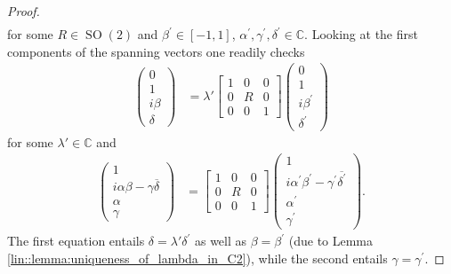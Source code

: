 \documentclass[10pt,a4paper]{amsart}
\newcommand{\C}{\mathbb{C}}
\DeclareMathOperator{\SO}{SO}
\begin{document}
\begin{proof}
\begin{align*}
    \end{align*}
    for some $R \in \SO(2)$ and $\beta^\prime \in [-1,1]$, $\alpha^\prime, \gamma^\prime, \delta^\prime \in \C$. Looking at the first components of the spanning vectors one readily checks
    \begin{align}
        \begin{pmatrix}
            0 \\ 1 \\ i \beta \\ \delta
        \end{pmatrix}
        &=
        \lambda' \left[\begin{array}{c|c|c}
            1& 0 & 0 \\
            \hline
            0 & R & 0 \\
            \hline 
            0 & 0 & 1
        \end{array}\right]
        \begin{pmatrix}
            0 \\ 1 \\ i \beta^\prime \\ \delta^\prime
        \end{pmatrix} 
    \end{align}
    for some $\lambda' \in \C$ and
    \begin{align}
    \label{ntg::eq:plane_lemma_case3}
        \begin{pmatrix}
            1 \\ i \alpha \beta - \gamma \overline{\delta} \\ \alpha \\ \gamma
        \end{pmatrix}
        &= 
        \left[\begin{array}{c|c|c}
            1& 0 & 0 \\
            \hline
            0 & R & 0 \\
            \hline 
            0 & 0 & 1
        \end{array}\right]
        \begin{pmatrix}
            1 \\ i \alpha^\prime \beta^\prime - \gamma^\prime \overline{\delta^\prime} \\ \alpha^\prime \\ \gamma^\prime
        \end{pmatrix}.
    \end{align}
    The first equation entails $\delta = \lambda' \delta^\prime$ as well as $\beta = \beta^\prime$ (due to Lemma \ref{lin::lemma:uniqueness_of_lambda_in_C2}), while the second entails $\gamma = \gamma^\prime$. 

\end{proof}
\end{document}
